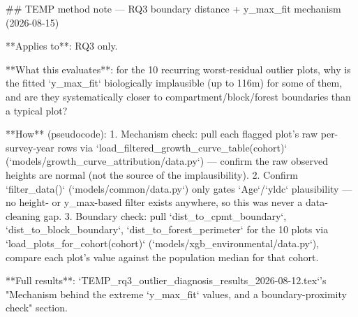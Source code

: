 ## TEMP method note — RQ3 boundary distance + y_max_fit mechanism (2026-08-15)

**Applies to**: RQ3 only.

**What this evaluates**: for the 10 recurring worst-residual outlier plots, why is the fitted
`y_max_fit` biologically implausible (up to 116m) for some of them, and are they systematically
closer to compartment/block/forest boundaries than a typical plot?

**How** (pseudocode):
1. Mechanism check: pull each flagged plot's raw per-survey-year rows via
   `load_filtered_growth_curve_table(cohort)` (`models/growth_curve_attribution/data.py`) — confirm
   the raw observed heights are normal (not the source of the implausibility).
2. Confirm `filter_data()` (`models/common/data.py`) only gates `Age`/`yldc` plausibility — no
   height- or y_max-based filter exists anywhere, so this was never a data-cleaning gap.
3. Boundary check: pull `dist_to_cpmt_boundary`, `dist_to_block_boundary`, `dist_to_forest_perimeter`
   for the 10 plots via `load_plots_for_cohort(cohort)` (`models/xgb_environmental/data.py`),
   compare each plot's value against the population median for that cohort.

**Full results**: `TEMP_rq3_outlier_diagnosis_results_2026-08-12.tex`'s "Mechanism behind the
extreme `y_max_fit` values, and a boundary-proximity check" section.
